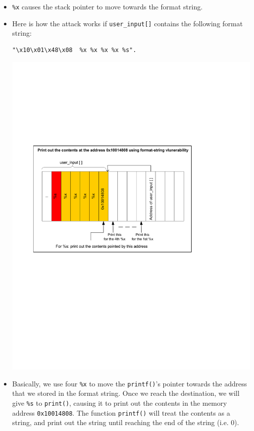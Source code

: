 \begin{itemize}
   \item {\tt \%x}  causes the stack pointer to move towards the format string.

   \item Here is how the attack works if {\tt user\_input[]} contains the
         following format string:

\begin{verbatim}      
"\x10\x01\x48\x08  %x %x %x %x %s".
\end{verbatim}
\begin{center}
\includegraphics*[viewport=0.6in 4.10in 6.5in 8.1in,width=5.5in,natwidth=621,natheight=403]{Figs/Format_String_Attack.pdf}
\end{center}

   \item Basically, we use four \verb|%x| to move the {\tt printf()}'s pointer
         towards the address that we stored in the format string. Once we reach
         the destination, we will give \verb|%s| to {\tt print()}, causing it
         to print out the contents in the memory address \verb|0x10014808|.
         The function {\tt printf()} will treat the contents as a string, and
         print out the string until reaching the end of the string (i.e.  0).


\end{itemize}
